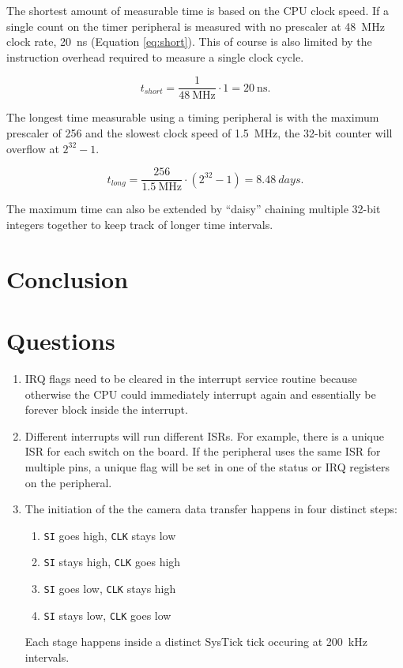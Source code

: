 \documentclass[CMPE]{../KGCOEReport}
\def\code#1{\texttt{#1}}
\begin{document}
	The shortest amount of measurable time is based on the CPU clock speed. If a single
	count on the timer peripheral is measured with no prescaler at \SI{48}{\mega\hertz}
	clock rate, \SI{20}{\nano\s} (Equation \ref{eq:short}).
	This of course is also limited by the instruction overhead required to measure a
	single clock cycle.

	\begin{equation}
	t_{short} = \frac{1}{\SI{48}{\mega\hertz}} \cdot 1 = \SI{20}{\nano\s}.
	\label{eq:short}
	\end{equation}

	The longest time measurable using
	a timing peripheral is with the maximum prescaler of 256 and the slowest clock speed
	of \SI{1.5}{\mega\hertz}, the 32-bit counter will overflow at $2^{32} - 1$.

	\begin{equation}
	t_{long} = \frac{256}{\SI{1.5}{\mega\hertz}} \cdot (2^{32} - 1) = \SI{8.48}{days}.
	\label{eq:long}
	\end{equation}

	The maximum time can also be extended by ``daisy'' chaining multiple 32-bit integers
	together to keep track of longer time intervals.

    \section*{Conclusion}

	

	\section*{Questions}

	\begin{enumerate}
	\item
	IRQ flags need to be cleared in the interrupt service routine because otherwise
	the CPU could immediately interrupt again and essentially be forever block inside
	the interrupt.
	\item
	Different interrupts will run different ISRs. For example, there is a unique ISR for
	each switch on the board. If the peripheral uses the same ISR for multiple pins,
	a unique flag will be set in one of the status or IRQ registers on the peripheral.  
	\item
	The initiation of the the camera data transfer happens in four distinct steps:
	\begin{enumerate}
	\item \code{SI} goes high,
	      \code{CLK} stays low
	\item \code{SI} stays high,
		  \code{CLK} goes high
	\item \code{SI} goes low,
		  \code{CLK} stays high
	\item \code{SI} stays low,
		  \code{CLK} goes low
	\end{enumerate}
	
	Each stage happens inside a distinct SysTick tick occuring at \SI{200}{\kilo\hertz}
	intervals.

	\end{enumerate}
\end{document}
